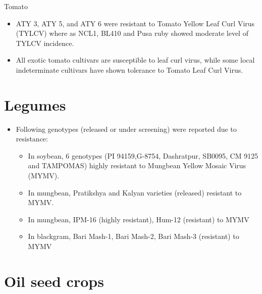 \documentclass[11pt,dvipsnames,ignorenonframetext,aspectratio=169]{beamer}
\providecommand{\tightlist}{%
  \setlength{\itemsep}{0pt}\setlength{\parskip}{0pt}}
\begin{document}
\begin{frame}{Tomato}
\protect\hypertarget{tomato}{}
\begin{itemize}
\tightlist
\item
  ATY 3, ATY 5, and ATY 6 were resistant to Tomato Yellow Leaf Curl
  Virus (TYLCV) where as NCL1, BL410 and Pusa ruby showed moderate level
  of TYLCV incidence.
\item
  All exotic tomato cultivars are susceptible to leaf curl virus, while
  some local indeterminate cultivars have shown tolerance to Tomato Leaf
  Curl Virus.
\end{itemize}
\end{frame}

\begin{frame}{}
\protect\hypertarget{section-5}{}
\end{frame}

\hypertarget{legumes}{%
\section{Legumes}\label{legumes}}

\begin{frame}{}
\protect\hypertarget{section-6}{}
\begin{itemize}
\tightlist
\item
  Following genotypes (released or under screening) were reported due to
  resistance:

  \begin{itemize}
  \tightlist
  \item
    In soybean, 6 genotypes (PI 94159,G-8754, Dashratpur, SB0095, CM
    9125 and TAMPOMAS) highly resistant to Mungbean Yellow Mosaic Virus
    (MYMV).
  \item
    In mungbean, Pratikshya and Kalyan varieties (released) resistant to
    MYMV.
  \item
    In mungbean, IPM-16 (highly resistant), Hum-12 (resistant) to MYMV
  \item
    In blackgram, Bari Mash-1, Bari Mash-2, Bari Mash-3 (resistant) to
    MYMV
  \end{itemize}
\end{itemize}
\end{frame}

\hypertarget{oil-seed-crops}{%
\section{Oil seed crops}\label{oil-seed-crops}}
\end{document}
